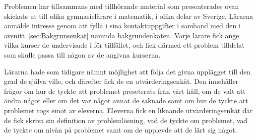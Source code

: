\textcolor{lila}{Problemen har tillsammans med tillhörande material som presenterades ovan skickats ut till olika gymnasielärare i matematik, i olika delar av Sverige. Lärarna anmälde intresse genom att fylla i sina kontaktuppgifter i samband med den i avsnitt~\ref{sec:Bakgrunsenkat} nämnda bakgrundenkäten. Varje lärare fick ange vilka kurser de undervisade i för tillfället, och fick därmed ett problem tilldelat som skulle passa till någon av de angivna kurserna.}

\textcolor{lila}{Lärarna hade som tidigare nämnt möjlighet att följa det givna upplägget till den grad de själva ville, och därefter fick de en utvärderingsenkät. Den innehåller frågor om hur de tyckte att problemet preseterats från vårt håll, om de valt att ändra något eller om det var något annat de saknade samt om hur de tyckte att problemet togs emot av eleverna. Eleverna fick en liknande utvärderingsenkät där de fick skriva sin definition av problemlösning, vad de tyckte om problemet, vad de tyckte om nivån på problemet samt om de upplevde att de lärt sig något.}
